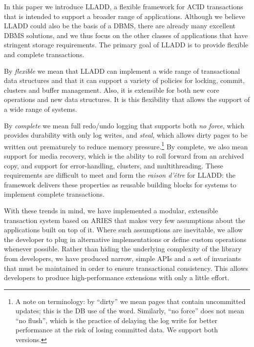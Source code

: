 \documentclass[10pt,letterpaper,twocolumn,english]{article}
\newcommand{\yad}{LLADD\xspace}
\begin{document}
In this paper we introduce \yad, a flexible framework for ACID
transactions that is intended to support a broader range of
applications.  Although we believe \yad could also be the basis of a
DBMS, there are already many excellent DBMS solutions, and we thus
focus on the other classes of applications that have stringent storage requirements.  The primary goal of \yad is to
provide flexible and complete transactions.

By {\em flexible} we mean that \yad can implement a wide range of
transactional data structures and that it can support a variety of
policies for locking, commit, clusters and buffer management. Also,
it is extensible for both new core operations and new data
structures.  It is this flexibility that allows the support of a wide
range of systems.

By {\em complete} we mean full redo/undo logging that supports both
{\em no force}, which provides durability with only log writes, and
{\em steal}, which allows dirty pages to be written out prematurely to
reduce memory pressure.\footnote{A note on terminology: by ``dirty''
we mean pages that contain uncommitted updates; this is the DB use of
the word. Similarly, ``no force'' does not mean ``no flush'', which is
the practice of delaying the log write for better performance at the
risk of losing committed data. We support both versions.} By complete,
we also mean support for media recovery, which is the ability to roll
forward from an archived copy, and support for error-handling,
clusters, and multithreading.  These requirements are difficult to
meet and form the {\em raison d'\^{e}tre} for \yad: the framework delivers
these properties as reusable building blocks for systems to implement 
complete transactions.

With these trends in mind, we have implemented a modular, extensible
transaction system based on ARIES that makes very few assumptions about the applications built on top of it. Where such
assumptions are inevitable, we allow 
the developer to plug in alternative implementations or
define custom operations whenever possible. Rather than hiding the underlying complexity
of the library from developers, we have produced narrow, simple APIs
and a set of invariants that must be maintained in order to ensure
transactional consistency.  This allows developers to produce
high-performance extensions with only a little effort.  
\end{document}
